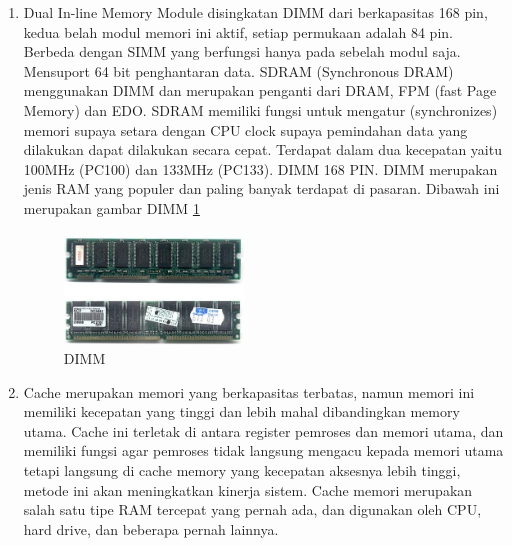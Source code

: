 \begin{enumerate}
\item Dual In-line Memory Module disingkatan DIMM dari  berkapasitas 168 pin, kedua belah modul memori ini aktif, setiap permukaan adalah 84 pin. Berbeda dengan SIMM yang berfungsi hanya pada sebelah modul saja. Mensuport 64 bit penghantaran data. SDRAM
(Synchronous DRAM) menggunakan DIMM dan merupakan penganti dari DRAM, FPM (fast Page Memory) dan EDO. SDRAM memiliki fungsi untuk mengatur (synchronizes) memori supaya setara dengan CPU clock supaya pemindahan data yang dilakukan dapat dilakukan secara cepat. Terdapat dalam dua kecepatan yaitu 100MHz (PC100) dan 133MHz (PC133). DIMM 168 PIN. DIMM merupakan jenis RAM yang populer dan paling banyak terdapat di pasaran. Dibawah ini merupakan gambar DIMM
\ref{labelgambar3}
\begin{figure}[htbp]
\centering
\includegraphics[width=0.45\textwidth]{figures/image/dimm.jpg}
\caption{DIMM}
\label{labelgambar3}
\end{figure}

\item Cache merupakan memori yang berkapasitas terbatas, namun memori ini memiliki kecepatan  yang tinggi dan lebih mahal dibandingkan memory utama. Cache ini terletak di antara register pemroses dan memori utama, dan memiliki fungsi agar pemroses tidak langsung mengacu kepada memori utama tetapi langsung di cache memory yang kecepatan aksesnya lebih tinggi, metode ini akan meningkatkan kinerja sistem. Cache memori merupakan salah satu tipe RAM tercepat yang pernah ada, dan digunakan oleh CPU, hard drive, dan beberapa pernah lainnya.


\end{enumerate}
